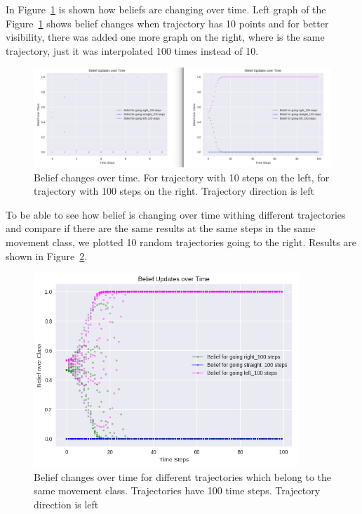 In Figure~\ref{fig:CompareLeftT} is shown how beliefs are changing over time. Left graph of the Figure~\ref{fig:CompareLeftT} shows belief changes when trajectory has 10 points and for better visibility, there was added one more graph on the right, where is the same trajectory, just it was interpolated 100 times instead of 10.

\begin{figure}[H]
	\centering  	
	\includegraphics[width=15cm]{img/10_100_compared_left_T.jpg}
	\caption{Belief changes over time. For trajectory with 10 steps on the left, for trajectory with 100 steps on the right. Trajectory direction is left}
	\label{fig:CompareLeftT}    
\end{figure}

To be able to see how belief is changing over time withing different trajectories and compare if there are the same results at the same steps in the same movement class, we plotted 10 random trajectories going to the right. Results are shown in Figure~\ref{fig:10LeftsT}.

\begin{figure}[H]
	\centering  	
	\includegraphics[width=10cm]{img/10_Left_T.jpg}
	\caption{Belief changes over time for different trajectories which belong to the same movement class. Trajectories have 100 time steps. Trajectory direction is left}
	\label{fig:10LeftsT}    
\end{figure}

